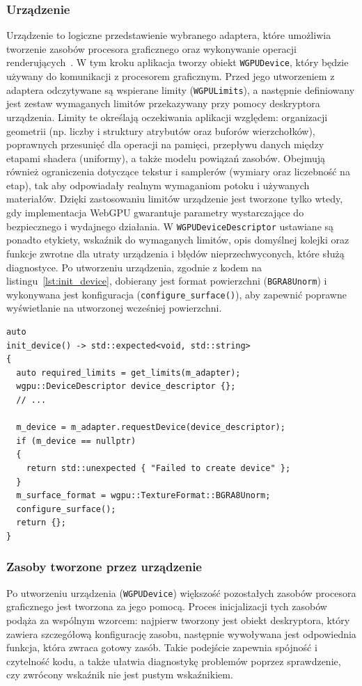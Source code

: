 \subsubsection{Urządzenie}
Urządzenie to logiczne przedstawienie wybranego adaptera, które umożliwia tworzenie zasobów procesora graficznego oraz wykonywanie operacji renderujących~\cite{WebGPU-draft}. W tym kroku aplikacja tworzy obiekt \texttt{WGPUDevice}, który będzie używany do komunikacji z procesorem graficznym. Przed jego utworzeniem z adaptera odczytywane są wspierane limity (\texttt{WGPULimits}), a następnie definiowany jest zestaw wymaganych limitów przekazywany przy pomocy deskryptora urządzenia. Limity te określają oczekiwania aplikacji względem: organizacji geometrii (np. liczby i struktury atrybutów oraz buforów wierzchołków), poprawnych przesunięć dla operacji na pamięci, przepływu danych między etapami shadera (uniformy), a także modelu powiązań zasobów. Obejmują również ograniczenia dotyczące tekstur i samplerów (wymiary oraz liczebność na etap), tak aby odpowiadały realnym wymaganiom potoku i używanych materiałów. Dzięki zastosowaniu limitów urządzenie jest tworzone tylko wtedy, gdy implementacja WebGPU gwarantuje parametry wystarczające do bezpiecznego i wydajnego działania. W \texttt{WGPUDeviceDescriptor} ustawiane są ponadto etykiety, wskaźnik do wymaganych limitów, opis domyślnej kolejki oraz funkcje zwrotne dla utraty urządzenia i błędów nieprzechwyconych, które służą diagnostyce. Po utworzeniu urządzenia, zgodnie z kodem na listingu~\ref{lst:init_device}, dobierany jest format powierzchni (\texttt{BGRA8Unorm}) i wykonywana jest konfiguracja (\texttt{configure\_surface()}), aby zapewnić poprawne wyświetlanie na utworzonej wcześniej powierzchni.
\begin{lstlisting}[caption={Funkcja inicjalizująca obiekt device}, label={lst:init_device}]
auto
init_device() -> std::expected<void, std::string>
{
  auto required_limits = get_limits(m_adapter);
  wgpu::DeviceDescriptor device_descriptor {};
  // ...

  m_device = m_adapter.requestDevice(device_descriptor);
  if (m_device == nullptr)
  {
    return std::unexpected { "Failed to create device" };
  }
  m_surface_format = wgpu::TextureFormat::BGRA8Unorm;
  configure_surface();
  return {};
}
\end{lstlisting}

\subsubsection{Zasoby tworzone przez urządzenie}
Po utworzeniu urządzenia (\texttt{WGPUDevice}) większość pozostałych zasobów procesora graficznego jest tworzona za jego pomocą. Proces inicjalizacji tych zasobów podąża za wspólnym wzorcem: najpierw tworzony jest obiekt deskryptora, który zawiera szczegółową konfigurację zasobu, następnie wywoływana jest odpowiednia funkcja, która zwraca gotowy zasób. Takie podejście zapewnia spójność i czytelność kodu, a także ułatwia diagnostykę problemów poprzez sprawdzenie, czy zwrócony wskaźnik nie jest pustym wskaźnikiem.


